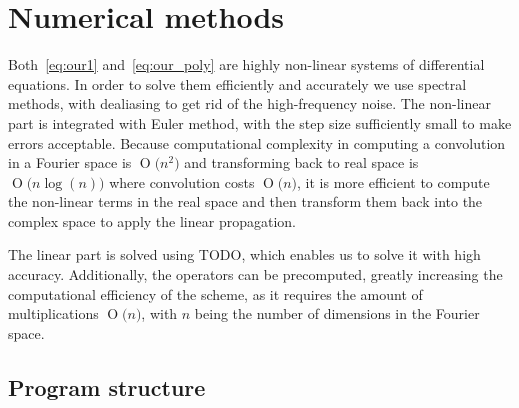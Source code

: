 \documentclass[11pt,a4paper]{article}
\newcommand{\BigO}[1]{\ensuremath{\operatorname{O}\bigl(#1\bigr)}}
\begin{document}
\section{Numerical methods}
Both~\eqref{eq:our1} and~\eqref{eq:our_poly} are highly non-linear systems of differential equations.
In order to solve them efficiently and accurately we use spectral methods\cite{Orszag80}, with dealiasing to get rid of the high-frequency noise.
The non-linear part is integrated with Euler method, with the step size sufficiently small to make errors acceptable.
Because computational complexity in computing a convolution in a Fourier space is \BigO{n^2} and transforming back to real space is \BigO{n\log(n)} where convolution costs \BigO{n}, it is more efficient to compute the non-linear terms in the real space and then transform them back into the complex space to apply the linear propagation.

The linear part is solved using TODO, which enables us to solve it with high accuracy.
Additionally, the operators can be precomputed, greatly increasing the computational efficiency of the scheme, as it requires the amount of multiplications \BigO{n}, with $n$ being the number of dimensions in the Fourier space.





\newpage
\begin{appendices}
    \section{Program structure}
\end{appendices}
\end{document}
